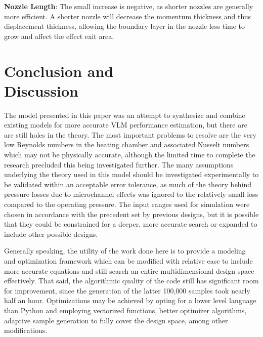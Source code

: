 \documentclass{homework}
\begin{document}
\begin{multicols}{2}

\textbf{Nozzle Length}: The small increase is negative, as shorter nozzles are generally more efficient. A shorter nozzle will decrease the momentum thickness and thus displacement thickness, allowing the boundary layer in the nozzle less time to grow and affect the effect exit area.

\section{Conclusion and \\ Discussion}

The model presented in this paper was an attempt to synthesize and combine existing models for more accurate VLM performance estimation, but there are are still holes in the theory. The most important problems to resolve are the very low Reynolds numbers in the heating chamber and associated Nusselt numbers which may not be physically accurate, although the limited time to complete the research precluded this being investigated further. The many assumptions underlying the theory used in this model should be investigated experimentally to be validated within an acceptable error tolerance, as much of the theory behind pressure losses due to microchannel effects was ignored to the relatively small loss compared to the operating pressure. The input ranges used for simulation were chosen in accordance with the precedent set by previous designs, but it is possible that they could be constrained for a deeper, more accurate search or expanded to include other possible designs.

Generally speaking, the utility of the work done here is to provide a modeling and optimization framework which can be modified with relative ease to include more accurate equations and still search an entire multidimensional design space effectively. That said, the algorithmic quality of the code still has significant room for improvement, since the generation of the latter 100,000 samples took nearly half an hour. Optimizations may be achieved by opting for a lower level language than Python and employing vectorized functions, better optimizer algorithms, adaptive sample generation to fully cover the design space, among other modifications. 


\end{multicols}
\end{document}
